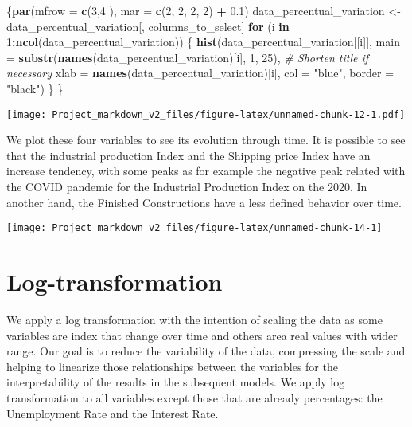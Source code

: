 \documentclass[
]{article}
\newenvironment{Shaded}{\begin{snugshade}}{\end{snugshade}}
\newcommand{\AttributeTok}[1]{\textcolor[rgb]{0.13,0.29,0.53}{#1}}
\newcommand{\CommentTok}[1]{\textcolor[rgb]{0.56,0.35,0.01}{\textit{#1}}}
\newcommand{\ControlFlowTok}[1]{\textcolor[rgb]{0.13,0.29,0.53}{\textbf{#1}}}
\newcommand{\DecValTok}[1]{\textcolor[rgb]{0.00,0.00,0.81}{#1}}
\newcommand{\FloatTok}[1]{\textcolor[rgb]{0.00,0.00,0.81}{#1}}
\newcommand{\FunctionTok}[1]{\textcolor[rgb]{0.13,0.29,0.53}{\textbf{#1}}}
\newcommand{\NormalTok}[1]{#1}
\newcommand{\OtherTok}[1]{\textcolor[rgb]{0.56,0.35,0.01}{#1}}
\newcommand{\SpecialCharTok}[1]{\textcolor[rgb]{0.81,0.36,0.00}{\textbf{#1}}}
\newcommand{\StringTok}[1]{\textcolor[rgb]{0.31,0.60,0.02}{#1}}
\begin{document}
\begin{Shaded}
\begin{Highlighting}[]
\NormalTok{\{}\FunctionTok{par}\NormalTok{(}\AttributeTok{mfrow =} \FunctionTok{c}\NormalTok{(}\DecValTok{3}\NormalTok{,}\DecValTok{4}\NormalTok{ ), }\AttributeTok{mar =} \FunctionTok{c}\NormalTok{(}\DecValTok{2}\NormalTok{, }\DecValTok{2}\NormalTok{, }\DecValTok{2}\NormalTok{, }\DecValTok{2}\NormalTok{) }\SpecialCharTok{+} \FloatTok{0.1}\NormalTok{)}
\NormalTok{data\_percentual\_variation }\OtherTok{\textless{}{-}}\NormalTok{ data\_percentual\_variation[, columns\_to\_select]}
\ControlFlowTok{for}\NormalTok{ (i }\ControlFlowTok{in} \DecValTok{1}\SpecialCharTok{:}\FunctionTok{ncol}\NormalTok{(data\_percentual\_variation)) \{}
  \FunctionTok{hist}\NormalTok{(data\_percentual\_variation[[i]], }
       \AttributeTok{main =} \FunctionTok{substr}\NormalTok{(}\FunctionTok{names}\NormalTok{(data\_percentual\_variation)[i], }\DecValTok{1}\NormalTok{, }\DecValTok{25}\NormalTok{), }\CommentTok{\# Shorten title if necessary}
       \AttributeTok{xlab =} \FunctionTok{names}\NormalTok{(data\_percentual\_variation)[i], }
       \AttributeTok{col =} \StringTok{"blue"}\NormalTok{, }
       \AttributeTok{border =} \StringTok{"black"}\NormalTok{)}
\NormalTok{\}}
\NormalTok{\}}
\end{Highlighting}
\end{Shaded}

\texttt{[image: Project\_markdown\_v2\_files/figure-latex/unnamed-chunk-12-1.pdf]}

We plot these four variables to see its evolution through time. It is
possible to see that the industrial production Index and the Shipping
price Index have an increase tendency, with some peaks as for example
the negative peak related with the COVID pandemic for the Industrial
Production Index on the 2020. In another hand, the Finished
Constructions have a less defined behavior over time.

\begin{center}\texttt{[image: Project\_markdown\_v2\_files/figure-latex/unnamed-chunk-14-1]} \end{center}

\section{Log-transformation}\label{log-transformation}

We apply a log transformation with the intention of scaling the data as
some variables are index that change over time and others area real
values with wider range. Our goal is to reduce the variability of the
data, compressing the scale and helping to linearize those relationships
between the variables for the interpretability of the results in the
subsequent models. We apply log transformation to all variables except
those that are already percentages: the Unemployment Rate and the
Interest Rate.
\end{document}
